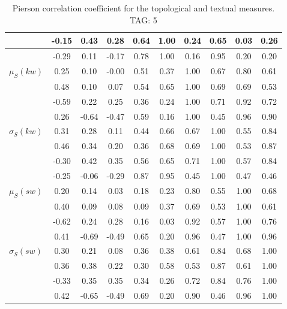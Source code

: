 \begin{table*}[h!]
\begin{center}
\begin{tabular}{| l | c | c | c | c | c | c | c | c | c |}
 & -0.15  & 0.43  & 0.28  & 0.64  & 1.00  & 0.24  & 0.65  & 0.03  & 0.26 \\\hline
 & -0.29  & 0.11  & -0.17  & 0.78  & 1.00  & 0.16  & 0.95  & 0.20  & 0.20 \\\hline
$\mu_S(kw)$ & 0.25  & 0.10  & -0.00  & 0.51  & 0.37  & 1.00  & 0.67  & 0.80  & 0.61 \\\hline
 & 0.48  & 0.10  & 0.07  & 0.54  & 0.65  & 1.00  & 0.69  & 0.69  & 0.53 \\\hline
 & -0.59  & 0.22  & 0.25  & 0.36  & 0.24  & 1.00  & 0.71  & 0.92  & 0.72 \\\hline
 & 0.26  & -0.64  & -0.47  & 0.59  & 0.16  & 1.00  & 0.45  & 0.96  & 0.90 \\\hline
$\sigma_S(kw)$ & 0.31  & 0.28  & 0.11  & 0.44  & 0.66  & 0.67  & 1.00  & 0.55  & 0.84 \\\hline
 & 0.46  & 0.34  & 0.20  & 0.36  & 0.68  & 0.69  & 1.00  & 0.53  & 0.87 \\\hline
 & -0.30  & 0.42  & 0.35  & 0.56  & 0.65  & 0.71  & 1.00  & 0.57  & 0.84 \\\hline
 & -0.25  & -0.06  & -0.29  & 0.87  & 0.95  & 0.45  & 1.00  & 0.47  & 0.46 \\\hline
$\mu_S(sw)$ & 0.20  & 0.14  & 0.03  & 0.18  & 0.23  & 0.80  & 0.55  & 1.00  & 0.68 \\\hline
 & 0.40  & 0.09  & 0.08  & 0.09  & 0.37  & 0.69  & 0.53  & 1.00  & 0.61 \\\hline
 & -0.62  & 0.24  & 0.28  & 0.16  & 0.03  & 0.92  & 0.57  & 1.00  & 0.76 \\\hline
 & 0.41  & -0.69  & -0.49  & 0.65  & 0.20  & 0.96  & 0.47  & 1.00  & 0.96 \\\hline
$\sigma_S(sw)$ & 0.30  & 0.21  & 0.08  & 0.36  & 0.38  & 0.61  & 0.84  & 0.68  & 1.00 \\\hline
 & 0.36  & 0.38  & 0.22  & 0.30  & 0.58  & 0.53  & 0.87  & 0.61  & 1.00 \\\hline
 & -0.33  & 0.35  & 0.35  & 0.34  & 0.26  & 0.72  & 0.84  & 0.76  & 1.00 \\\hline
 & 0.42  & -0.65  & -0.49  & 0.69  & 0.20  & 0.90  & 0.46  & 0.96  & 1.00 \\\hline
\end{tabular}
\caption{Pierson correlation coefficient for the topological and textual measures. TAG: 5}
\end{center}
\end{table*}